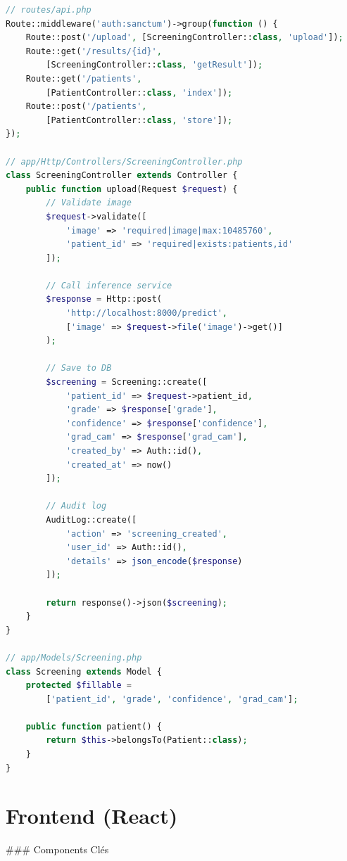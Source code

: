\documentclass[12pt,a4paper,oneside]{report}
\begin{document}
\begin{lstlisting}[language=PHP, caption=Structures backend Laravel]
// routes/api.php
Route::middleware('auth:sanctum')->group(function () {
    Route::post('/upload', [ScreeningController::class, 'upload']);
    Route::get('/results/{id}', 
        [ScreeningController::class, 'getResult']);
    Route::get('/patients', 
        [PatientController::class, 'index']);
    Route::post('/patients', 
        [PatientController::class, 'store']);
});

// app/Http/Controllers/ScreeningController.php
class ScreeningController extends Controller {
    public function upload(Request $request) {
        // Validate image
        $request->validate([
            'image' => 'required|image|max:10485760',
            'patient_id' => 'required|exists:patients,id'
        ]);
        
        // Call inference service
        $response = Http::post(
            'http://localhost:8000/predict',
            ['image' => $request->file('image')->get()]
        );
        
        // Save to DB
        $screening = Screening::create([
            'patient_id' => $request->patient_id,
            'grade' => $response['grade'],
            'confidence' => $response['confidence'],
            'grad_cam' => $response['grad_cam'],
            'created_by' => Auth::id(),
            'created_at' => now()
        ]);
        
        // Audit log
        AuditLog::create([
            'action' => 'screening_created',
            'user_id' => Auth::id(),
            'details' => json_encode($response)
        ]);
        
        return response()->json($screening);
    }
}

// app/Models/Screening.php
class Screening extends Model {
    protected $fillable = 
        ['patient_id', 'grade', 'confidence', 'grad_cam'];
    
    public function patient() {
        return $this->belongsTo(Patient::class);
    }
}
\end{lstlisting}

\section{Frontend (React)}

### Components Clés
\end{document}
